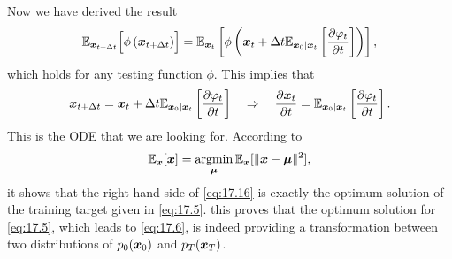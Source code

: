 Now we have derived the result
\begin{equation}
    \label{eq:17.15}
    \mathbb{E}_{\bm{x}_{t+\Delta t}}\Bigl[ \phi\left(\bm{x}_{t+\Delta t} \right)\Bigr] =\mathbb{E}_{\bm{x}_{t}}\left[ \phi\left(\bm{x}_{t}+\Delta t  \mathbb{E}_{\bm{x}_0|\bm{x}_{t}} \left[\frac{\partial \varphi_t}{\partial t}\right] \right)\right],
\end{equation}
which holds for any testing function $\phi$. This implies that
\begin{equation}
    \label{eq:17.16}
    \bm{x}_{t+\Delta t} =\bm{x}_{t}+\Delta t  \mathbb{E}_{\bm{x}_0|\bm{x}_{t}} \left[\frac{\partial \varphi_t}{\partial t}\right] \quad\Rightarrow\quad \frac{\partial \bm{x}_{t}}{\partial t}=\mathbb{E}_{\bm{x}_0|\bm{x}_{t}} \left[\frac{\partial \varphi_t}{\partial t}\right] .
\end{equation}
This is the ODE that we are looking for. According to 
\begin{equation}
    \label{eq:17.17}
    \mathbb{E}_{\bm{x}}[\bm{x}]=\operatorname*{argmin}_{\bm{\mu}} \mathbb{E}_{\bm{x}}[\|\bm{x}-\bm{\mu}\|^2],
\end{equation}
it shows that the right-hand-side of \cref{eq:17.16} is exactly the optimum solution of the training target given in \cref{eq:17.5}. this proves that the optimum solution for \cref{eq:17.5}, which leads to \cref{eq:17.6}, is indeed providing a transformation between two distributions of $p_0(\bm{x}_0)$ and $p_T(\bm{x}_T)$.